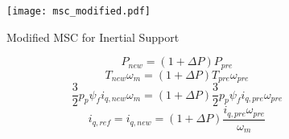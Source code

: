\begin{figure}[h!]
	\centering
	\texttt{[image: msc\_modified.pdf]}
	\caption{Modified MSC for Inertial Support}
	\label{modifiedmsc}
\end{figure}
\begin{equation}
P_{new}=(1+\Delta P) P_{pre}
\label{inertialsupport1}
\end{equation}
\begin{equation}
T_{new} \omega_{m}=(1+\Delta P) T_{pre} \omega_{pre}
\label{inertialsupport2}
\end{equation}
\begin{equation}
\frac{3}{2} p_{p} \psi_{f} i_{q,new} \omega_{m}=(1+\Delta P) \frac{3}{2} p_{p} \psi_{f} i_{q,pre} \omega_{pre}
\label{inertialsupport3}
\end{equation}
\begin{equation}
 i_{q,ref}=i_{q,new}=(1+\Delta P) \frac{i_{q,pre} \omega_{pre}}{ \omega_{m}} 
\label{inertialsupport4}
\end{equation}
